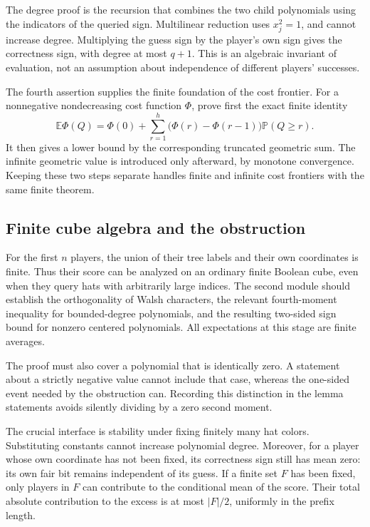 \documentclass[11pt,letterpaper]{article}
\theoremstyle{definition}
\begin{document}
The degree proof is the recursion that combines the two child polynomials
using the indicators of the queried sign.  Multilinear reduction uses
\(x_j^2=1\), and cannot increase degree.  Multiplying the guess sign by the
player's own sign gives the correctness sign, with degree at most \(q+1\).
This is an algebraic invariant of evaluation, not an assumption about
independence of different players' successes.

The fourth assertion supplies the finite foundation of the cost frontier.
For a nonnegative nondecreasing cost function \(\Phi\), prove first the exact
finite identity
\[
 \mathbb E\Phi(Q)
 =\Phi(0)+\sum_{r=1}^{h}
       \bigl(\Phi(r)-\Phi(r-1)\bigr)\mathbb P(Q\ge r).
\]
It then gives a lower bound by the corresponding truncated geometric sum.
The infinite geometric value is introduced only afterward, by monotone
convergence.  Keeping these two steps separate handles finite and infinite
cost frontiers with the same finite theorem.

\subsection{Finite cube algebra and the obstruction}

For the first \(n\) players, the union of their tree labels and their own
coordinates is finite.  Thus their score can be analyzed on an ordinary
finite Boolean cube, even when they query hats with arbitrarily large
indices.  The second module should establish the orthogonality of Walsh
characters, the relevant fourth-moment inequality for bounded-degree
polynomials, and the resulting two-sided sign bound for nonzero centered
polynomials.  All expectations at this stage are finite averages.

The proof must also cover a polynomial that is identically zero.  A statement
about a strictly negative value cannot include that case, whereas the
one-sided event needed by the obstruction can.  Recording this distinction in
the lemma statements avoids silently dividing by a zero second moment.

The crucial interface is stability under fixing finitely many hat colors.
Substituting constants cannot increase polynomial degree.  Moreover, for a
player whose own coordinate has not been fixed, its correctness sign still
has mean zero: its own fair bit remains independent of its guess.  If a
finite set \(F\) has been fixed, only players in \(F\) can contribute to the
conditional mean of the score.  Their total absolute contribution to the
excess is at most \(|F|/2\), uniformly in the prefix length.
\end{document}
